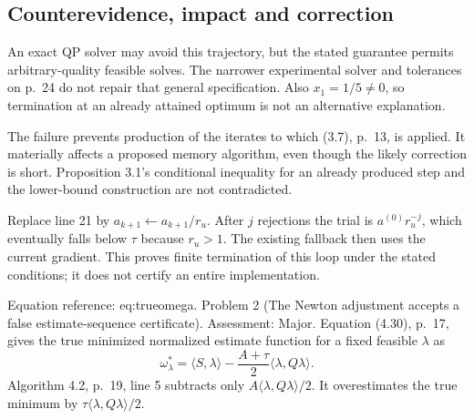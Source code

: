\documentclass[10pt]{article}
\begin{document}
\subsection*{Counterevidence, impact and correction}
An exact QP solver may avoid this trajectory, but the stated guarantee permits arbitrary-quality feasible solves. The narrower experimental solver and tolerances on p. 24 do not repair that general specification. Also \(x_1=1/5\ne0\), so termination at an already attained optimum is not an alternative explanation.\par
The failure prevents production of the iterates to which (3.7), p. 13, is applied. It materially affects a proposed memory algorithm, even though the likely correction is short. Proposition 3.1’s conditional inequality for an already produced step and the lower-bound construction are not contradicted.\par
Replace line 21 by \(a_{k+1}\leftarrow a_{k+1}/r_u\). After \(j\) rejections the trial is \(a^{(0)}r_u^{-j}\), which eventually falls below \(\tau\) because \(r_u>1\). The existing fallback then uses the current gradient. This proves finite termination of this loop under the stated conditions; it does not certify an entire implementation.\par
Equation reference: eq:trueomega. Problem 2 (The Newton adjustment accepts a false estimate-sequence certificate).  Assessment: Major. Equation (4.30), p. 17, gives the true minimized normalized estimate function for a fixed feasible \(\lambda\) as \[
 \omega_\lambda^*=\langle S,\lambda\rangle-
                 \frac{A+\tau}{2}\langle\lambda,Q\lambda\rangle.\] Algorithm 4.2, p. 19, line 5 subtracts only \(A\langle\lambda,Q\lambda\rangle/2\). It overestimates the true minimum by \(\tau\langle\lambda,Q\lambda\rangle/2\).\par
\end{document}
